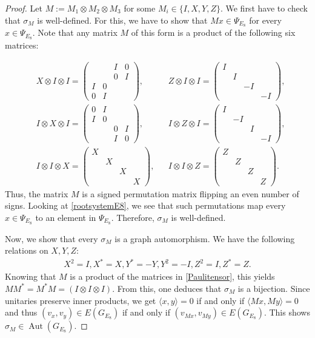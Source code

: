 \documentclass[11pt]{article}
\theoremstyle{definition}
\numberwithin{equation}{section}
\DeclareMathOperator{\aut}{Aut}
\begin{document}
\begin{proof}
Let $M:=M_1\otimes M_2 \otimes M_3$ for some $M_i \in \{I,X,Y,Z\}$. We first have to check that $\sigma_M$ is well-defined. For this, we have to show that $Mx\in \Psi_{E_8}$ for every $x \in \Psi_{E_8}$. Note that any matrix $M$ of this form is a product of the following six matrices:

\begin{align}
&X\otimes I\otimes I=\begin{pmatrix}&&I&0\\&&0&I\\I&0&&\\0&I&&\end{pmatrix}, 
&&Z\otimes I\otimes I=\begin{pmatrix}I&&&\\&I&&\\&&-I&\\&&&-I\end{pmatrix},\nonumber\\
&I\otimes X\otimes I=\begin{pmatrix}0&I&&\\I&0&&\\&&0&I\\&&I&0\end{pmatrix},
&&I\otimes Z\otimes I=\begin{pmatrix}I&&&\\&-I&&\\&&I&\\&&&-I\end{pmatrix}
,\nonumber\\
&I\otimes I\otimes X=\begin{pmatrix}X&&&\\&X&&\\&&X&\\&&&X\end{pmatrix},
&&I\otimes I\otimes Z=\begin{pmatrix}Z&&&\\&Z&&\\&&Z&\\&&&Z\end{pmatrix}.\label{Paulitensor}
\end{align}
Thus, the matrix $M$ is a signed permutation matrix flipping an even number of signs. Looking at \eqref{rootsystemE8}, we see that such permutations map every $x\in\Psi_{E_8}$ to an element in $\Psi_{E_8}$. Therefore, $\sigma_M$ is well-defined.

Now, we show that every $\sigma_M$ is a graph automorphism. We have the following relations on $X,Y,Z$:
\begin{align*}
    X^2=I, X^*=X, Y^*=-Y, Y^2=-I, Z^2=I, Z^*=Z.
\end{align*}
Knowing that $M$ is a product of the matrices in \eqref{Paulitensor}, this yields $MM^*=M^*M=(I\otimes I\otimes I)$. From this, one deduces that $\sigma_M$ is a bijection. Since unitaries preserve inner products, we get $\langle x,y\rangle=0$ if and only if $\langle Mx,My \rangle=0$ and thus $(v_x,v_y)\in E(G_{E_8})$ if and only if $(v_{Mx}, v_{My})\in E(G_{E_8})$. This shows $\sigma_M\in \aut(G_{E_8})$.


\end{proof}
\end{document}

